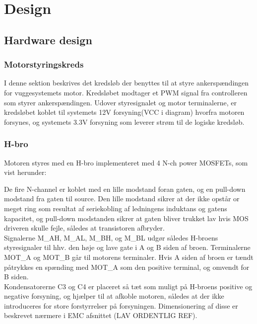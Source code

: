 \section{Design}
\subsection{Hardware design}

\subsubsection{Motorstyringskreds}
I denne sektion beskrives det kredsløb der benyttes til at styre ankerspændingen for vuggesystemets motor. Kredsløbet modtager et PWM signal fra controlleren som styrer ankerspændingen. Udover styresignalet og motor terminalerne, er kredsløbet koblet til systemets 12V forsyning(VCC i diagram) hvorfra motoren forsynes, og systemets 3.3V forsyning som leverer strøm til de logiske kredsløb.\\


\subsubsection*{H-bro}
Motoren styres med en H-bro implementeret med 4 N-ch power MOSFETs, som vist herunder:


De fire N-channel er koblet med en lille modstand foran gaten, og en pull-down modstand fra gaten til source. Den lille modstand sikrer at der ikke opstår or meget ring som resultat af seriekobling af ledningens induktans og gatens kapacitet, og pull-down modstanden sikrer at gaten bliver trukket lav hvis MOS driveren skulle fejle, således at transistoren afbryder. \\ 
Signalerne M\_AH, M\_AL, M\_BH, og M\_BL udgør således H-broens styresignaler til hhv. den høje og lave gate i A og B siden af broen. Terminalerne MOT\_A og MOT\_B går til motorens terminaler. Hvis A siden af broen er tændt påtrykkes en spænding med MOT\_A som den positive terminal, og omvendt for B siden. \\
Kondensatorerne C3 og C4 er placeret så tæt som muligt på H-broens positive og negative forsyning, og hjælper til at afkoble motoren, således at der ikke introduceres for store forstyrrelser på forsyningen. Dimensionering af disse er beskrevet nærmere i EMC afsnittet (LAV ORDENTLIG REF).\\

